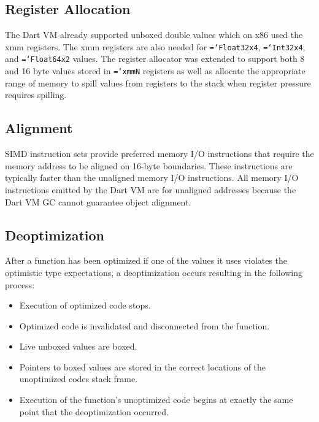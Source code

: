 \documentclass[preprint]{sigplanconf}
\newcommand{\ttt}[1]{{\texttt{\hyphenchar\font=`\-\relax #1}}}%
\begin{document}
\subsection{Register Allocation}

The Dart VM already supported unboxed double values which on x86 used the xmm
registers. The xmm registers are also needed for \ttt{Float32x4}, \ttt{Int32x4},
and \ttt{Float64x2} values. The register allocator was extended to support both
8 and 16 byte values stored in \ttt{xmmN} registers as well as allocate the
appropriate range of memory to spill values from registers to the stack when
register pressure requires spilling.

\subsection{Alignment}

SIMD instruction sets provide preferred memory I/O instructions that require the
memory address to be aligned on 16-byte boundaries. These instructions are
typically faster than the unaligned memory I/O instructions. All memory I/O
instructions emitted by the Dart VM are for unaligned addresses because the Dart
VM GC cannot guarantee object alignment.

\subsection{Deoptimization}
\label{deoptimizing}

After a function has been optimized if one of the values it uses violates the
optimistic type expectations, a deoptimization occurs resulting in the following
process:

\begin{itemize}
\item
Execution of optimized code stops.

\item
Optimized code is invalidated and disconnected from the function.

\item
Live unboxed values are boxed.

\item
Pointers to boxed values are stored in the correct locations of the unoptimized
codes stack frame.

\item
Execution of the function's unoptimized code begins at exactly the same point
that the deoptimization occurred.

\end{itemize}
\end{document}
